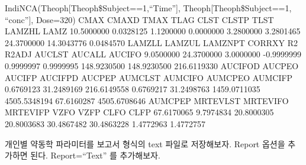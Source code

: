 \documentclass[]{krantz}
\renewenvironment{quote}{\begin{VF}}{\end{VF}}
\theoremstyle{definition}
\theoremstyle{definition}
\theoremstyle{definition}
\theoremstyle{remark}
\begin{document}
\begin{quote}
IndiNCA(Theoph{[}Theoph\$Subject==1,``Time''{]},
Theoph{[}Theoph\$Subject==1, ``conc''{]}, Dose=320) CMAX CMAXD TMAX TLAG
CLST CLSTP TLST LAMZHL LAMZ 10.5000000 0.0328125 1.1200000 0.0000000
3.2800000 3.2801465 24.3700000 14.3043776 0.0484570 LAMZLL LAMZUL
LAMZNPT CORRXY R2 R2ADJ AUCLST AUCALL AUCIFO 9.0500000 24.3700000
3.0000000 -0.9999999 0.9999997 0.9999995 148.9230500 148.9230500
216.6119330 AUCIFOD AUCPEO AUCIFP AUCIFPD AUCPEP AUMCLST AUMCIFO AUMCPEO
AUMCIFP 0.6769123 31.2489169 216.6149558 0.6769217 31.2498763
1459.0711035 4505.5348194 67.6160287 4505.6708646 AUMCPEP MRTEVLST
MRTEVIFO MRTEVIFP VZFO VZFP CLFO CLFP 67.6170065 9.7974834 20.8000305
20.8003683 30.4867482 30.4863228 1.4772963 1.4772757
\end{quote}

개인별 약동학 파라미터를 보고서 형식의 text 파일로 저장해보자. Report
옵션을 추가하면 된다. Report=``Text'' 를 추가해보자.
\end{document}
